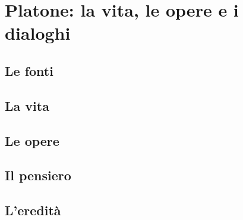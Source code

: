 \chapter{Platone: la vita, le opere e i dialoghi}

\section{Le fonti}

\section{La vita}

\section{Le opere}

\section{Il pensiero}

\section{L'eredità}
